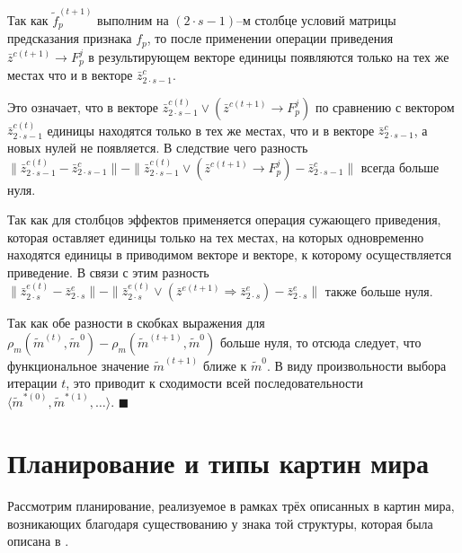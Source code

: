 \documentclass[a4paper, 12pt]{article}
\theoremstyle{plain}
\newenvironment{Proof}%
	{\par\noindent{\bf Доказательство.}}%
	{\hfill$\scriptstyle\blacksquare$}
\begin{document}
\begin{Proof}
		Так как $\tilde f_p^{(t+1)}$ выполним на $(2\cdot s-1)$–м столбце условий матрицы предсказания признака $f_p$, то после применении операции приведения $\bar z^{c(t+1)}\rightarrow F_p^j$ в результирующем векторе единицы появляются только на тех же местах что и в векторе $\bar z_{2\cdot s-1}^c$. 
		
		Это означает, что в векторе $\bar z_{2\cdot s-1}^{c(t)}\vee(\bar z^{c(t+1)}\rightarrow F_p^j)$ по сравнению с вектором $\bar z_{2\cdot s-1}^{c(t)}$  единицы находятся только в тех же местах, что и в векторе $\bar z_{2\cdot s-1}^c$, а новых нулей не появляется. В следствие чего разность $\|\bar z_{2\cdot s-1}^{c(t)}-\bar z_{2\cdot s-1}^c\|-\|\bar z_{2\cdot s-1}^{c(t)}\vee(\bar z^{c(t+1)}\rightarrow F_p^j)-\bar z_{2\cdot s-1}^c\|$ всегда больше нуля.
		
		Так как для столбцов эффектов применяется операция сужающего приведения, которая оставляет единицы только на тех местах, на которых одновременно находятся единицы в приводимом векторе и векторе, к которому осуществляется приведение. В связи с этим разность $\|\bar z_{2\cdot s}^{e(t)}-\bar z_{2\cdot s}^e\|-\|\bar z_{2\cdot s}^{e(t)}\vee(\bar z^{e(t+1)}\Rightarrow\bar z_{2\cdot s}^e)-\bar z_{2\cdot s}^e\|$ также больше нуля.
		
		Так как обе разности в скобках выражения для $\rho_m(\tilde m^{(t)},\tilde m^0)-\rho_m(\tilde m^{(t+1)},\tilde m^0)$ больше нуля, то отсюда следует, что функциональное значение $\tilde m^{(t+1)}$ ближе к $\tilde m^0$. В виду произвольности выбора итерации $t$, это приводит к сходимости всей последовательности $\langle\tilde m^{*(0)},\tilde m^{*(1)},\dots\rangle$. 
	\end{Proof}
	
	\section{Планирование и типы картин мира} Рассмотрим планирование, реализуемое в рамках трёх описанных в \cite{Chudova2012a} картин мира, возникающих благодаря существованию у знака той структуры, которая была описана в \cite{PanovA2014a}.
	
\end{document}
